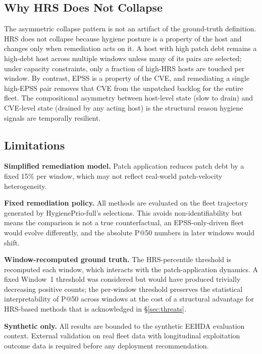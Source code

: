 \subsection{Why HRS Does Not Collapse}

The asymmetric collapse pattern is not an artifact of the ground-truth definition. HRS does not collapse because hygiene posture is a property of the host and changes only when remediation acts on it. A host with high patch debt remains a high-debt host across multiple windows unless many of its pairs are selected; under capacity constraints, only a fraction of high-HRS hosts are touched per window. By contrast, EPSS is a property of the CVE, and remediating a single high-EPSS pair removes that CVE from the unpatched backlog for the entire fleet. The compositional asymmetry between host-level state (slow to drain) and CVE-level state (drained by any acting host) is the structural reason hygiene signals are temporally resilient.

\subsection{Limitations}

\textbf{Simplified remediation model.} Patch application reduces patch debt by a fixed 15\% per window, which may not reflect real-world patch-velocity heterogeneity.

\textbf{Fixed remediation policy.} All methods are evaluated on the fleet trajectory generated by HygienePrio-full's selections. This avoids non-identifiability but means the comparison is not a true counterfactual, an EPSS-only-driven fleet would evolve differently, and the absolute P@50 numbers in later windows would shift.

\textbf{Window-recomputed ground truth.} The HRS-percentile threshold is recomputed each window, which interacts with the patch-application dynamics. A fixed Window~1 threshold was considered but would have produced trivially decreasing positive counts; the per-window threshold preserves the statistical interpretability of P@50 across windows at the cost of a structural advantage for HRS-based methods that is acknowledged in \S\ref{sec:threats}.

\textbf{Synthetic only.} All results are bounded to the synthetic EEHDA evaluation context. External validation on real fleet data with longitudinal exploitation outcome data is required before any deployment recommendation.
